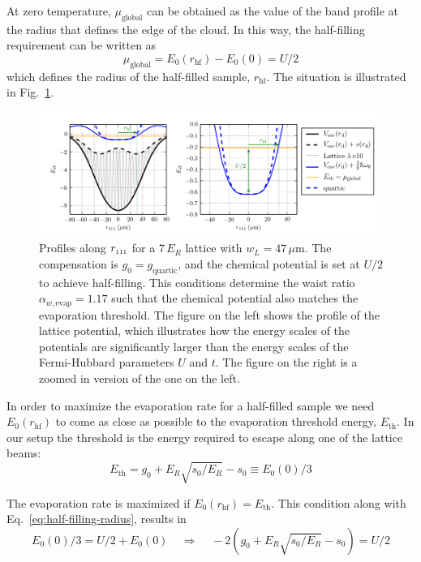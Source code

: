 \documentclass[11pt,letter]{article}
\newcommand{\rdiag}{\ensuremath{ r_{\text{\tiny{111}}} } }
\newcommand{\awaistevap}{\ensuremath{ \alpha_{w,\text{evap}} }}
\begin{document}
At zero temperature, $\mu_{\text{global}}$  can be obtained as the
value of the band profile at the radius that defines the edge of the cloud.  In
this way, the half-filling requirement can be written as 
\begin{equation}
    \mu_{\text{global}} =  E_{0}(r_{\text{hf}}) - E_{0}(0) = U/2 
  \label{eq:half-filling-radius} 
\end{equation} 
which defines the radius of the half-filled sample, $r_{\text{hf}}$.  The situation is illustrated in Fig.~\ref{fig:lattice_general-comp}. 
\begin{figure}
    \centering
\includegraphics[width=1.0\textwidth]{figures/lattice_general-comp.png}
\caption{Profiles along $\rdiag$ for a 7\,$E_{R}$ lattice with
$w_{L}=47\,\mu$m.  The compensation is $g_{0}=g_{\text{quartic}}$, and the
chemical potential is set at $U/2$ to achieve half-filling.  This conditions
determine the waist ratio $\awaistevap=1.17$ such that the chemical potential
also matches the evaporation threshold.  The figure on the left shows the
profile of the  lattice potential, which illustrates how the energy scales of
the potentials are significantly larger than the energy scales of the
Fermi-Hubbard parameters $U$ and $t$.   The figure on the right is a zoomed in
version of the one on the left.   }
\label{fig:lattice_general-comp}
\end{figure}


In order to maximize the evaporation rate for a half-filled sample we need
$E_{0}(r_{\text{hf}})$ to come as close as possible to the evaporation
threshold energy, $E_{\text{th}}$.  In our setup the threshold is the energy
required to escape along one of the lattice beams: 
\begin{equation} 
  E_{\text{th}} =  g_{0} + E_{R}\sqrt{s_{0}/E_{R}} - s_{0}  \equiv E_{0}(0)/3 
\end{equation}

The evaporation rate is maximized if $E_{0}(r_{\text{hf}}) = E_{\text{th}} $.
This condition along with Eq.~\ref{eq:half-filling-radius}, results in
\begin{equation}
  E_{0}(0)/3  = U/2 + E_{0}(0) \ \ \ \ \ \Rightarrow \ \ \ \ \ 
  -2( g_{0} + E_{R}\sqrt{s_{0}/E_{R}} - s_{0} ) = U/2  
  \label{eq:optimal-evap} 
\end{equation} 
 
\end{document}
